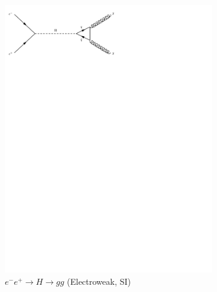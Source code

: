 \begin{figure}[h]
\begin{subfigure}[b]{0.3\textwidth}
    \includegraphics[trim={0.5cm 22cm 10cm 0cm},width=\textwidth]{../Diagrams/D12.pdf}
    \caption{$e^-e^+\rightarrow H \rightarrow gg$ (Electroweak, SI)}
    \label{fey:12}
  \end{subfigure}
  \newline
  \newline
  \begin{subfigure}[b]{0.3\textwidth}

\end{subfigure}
\end{figure}
